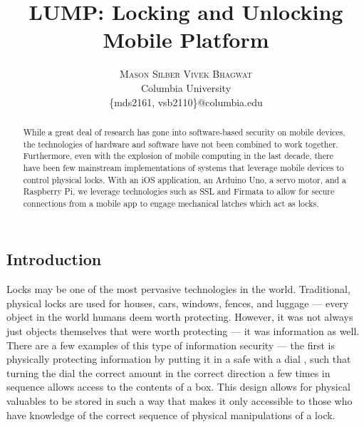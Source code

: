 \documentclass[10pt]{article}
\title{\vspace{-15mm}\fontsize{24pt}{10pt}\selectfont\textbf{LUMP: Locking and Unlocking Mobile Platform}} %
\author{
    \large
    \textsc{Mason Silber \quad Vivek Bhagwat}\\[2mm] %
    \normalsize Columbia University \\ %
    \normalsize \{mds2161, vsb2110\}@columbia.edu %
    \vspace{-5mm}
}
\date{}
\begin{document}
\maketitle %



\begin{multicols}{2} %


\begin{abstract}

While a great deal of research has gone into software-based security on mobile devices, the technologies of hardware and software have not been combined to work together. Furthermore, even with the explosion of mobile computing in the last decade, there have been few mainstream implementations of systems that leverage mobile devices to control physical locks. With an iOS application, an Arduino Uno, a servo motor, and a Raspberry Pi, we leverage technologies such as SSL and Firmata to allow for secure connections from a mobile app to engage mechanical latches which act as locks.

\end{abstract}

\section{Introduction}
Locks may be one of the most pervasive technologies in the world. Traditional, physical locks are used for houses, cars, windows, fences, and luggage --- every object in the world humans deem worth protecting. However, it was not always just objects themselves that were worth protecting --- it was information as well.\\

There are a few examples of this type of information security --- the first is physically protecting information by putting it in a safe with a dial \cite{safestructure}, such that turning the dial the correct amount in the correct direction a few times in sequence allows access to the contents of a box. This design allows for physical valuables to be stored in such a way that makes it only accessible to those who have knowledge of the correct sequence of physical manipulations of a lock. \\


\end{multicols}
\end{document}
